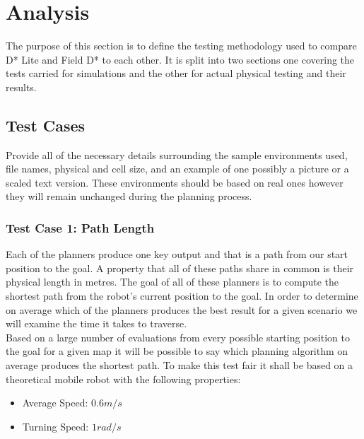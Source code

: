 \chapter{Analysis}

\noindent
The purpose of this section is to define the testing methodology used to compare D* Lite and Field D* to each other. It is split into two sections one covering the tests carried for simulations and the other for actual physical testing and their results.


\section{Test Cases}

\noindent
Provide all of the necessary details surrounding the sample environments used, file names, physical and cell size, and an example of one possibly a picture or a scaled text version. These environments should be based on real ones however they will remain unchanged during the planning process.

\newpage

\subsection{Test Case 1: Path Length}

\noindent 
Each of the planners produce one key output and that is a path from our start position to the goal. A property that all of these paths share in common is their physical length in metres. The goal of all of these planners is to compute the shortest path from the robot's current position to the goal. In order to determine on average which of the planners produces the best result for a given scenario we will examine the time it takes to traverse. \\

\noindent
Based on a large number of evaluations from every possible starting position to the goal for a given map it will be possible to say which planning algorithm on average produces the shortest path. To make this test fair it shall be based on a theoretical mobile robot with the following properties: 

\begin{itemize}
\item Average Speed: $0.6m/s$
\item Turning Speed: $1rad/s$ 
\end{itemize} 

